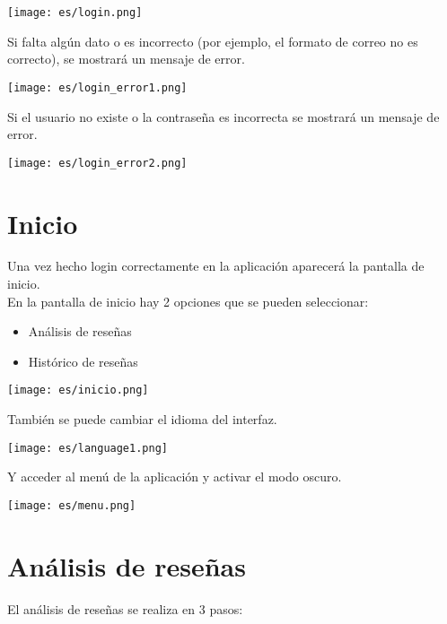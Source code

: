 \documentclass{ol-softwaremanual}
\begin{document}
\vspace{20pt}
\centerline{\texttt{[image: es/login.png]}} 
\vspace{20pt}

Si falta algún dato o es incorrecto (por ejemplo, el formato de correo no es correcto), se mostrará un mensaje de error.\\

\vspace{20pt}
\centerline{\texttt{[image: es/login\_error1.png]}}
\vspace{20pt}

Si el usuario no existe o la contraseña es incorrecta se mostrará un mensaje de error.

\vspace{20pt}
\centerline{\texttt{[image: es/login\_error2.png]}}
\vspace{20pt}

\newpage
\section{Inicio}
Una vez hecho login correctamente en la aplicación aparecerá la pantalla de inicio.\\
En la pantalla de inicio hay 2 opciones que se pueden seleccionar:
\begin{itemize}
    \item Análisis de reseñas
    \item Histórico de reseñas
\end{itemize}

\vspace{20pt}
\centerline{\texttt{[image: es/inicio.png]}}
\vspace{20pt}

También se puede cambiar el idioma del interfaz.

\vspace{20pt}
\centerline{\texttt{[image: es/language1.png]}}
\vspace{20pt}

Y acceder al menú de la aplicación y activar el modo oscuro.

\vspace{20pt}
\centerline{\texttt{[image: es/menu.png]}}
\vspace{20pt}


\newpage
\section{Análisis de reseñas}
El análisis de reseñas se realiza en 3 pasos:
\end{document}
